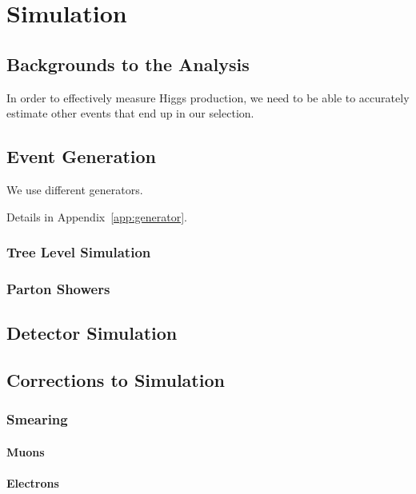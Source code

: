 \chapter{Simulation} \label{ch:simulation}

\section{Backgrounds to the Analysis}

In order to effectively measure Higgs production,
we need to be able to accurately estimate other events
that end up in our selection.

\section{Event Generation}

We use different generators.

Details in Appendix~\ref{app:generator}.

\subsection{Tree Level Simulation}

\subsection{Parton Showers}

\section{Detector Simulation}


\section{Corrections to Simulation}

\subsection{Smearing}

\subsubsection{Muons}

\subsubsection{Electrons}


